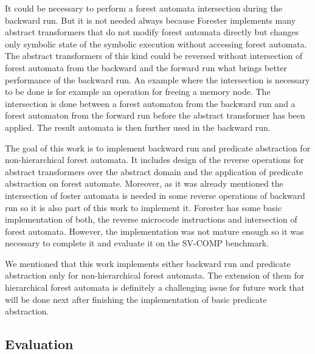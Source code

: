 \documentclass[fleqn,11pt]{ExcelAtFIT} %
\begin{document}
It could be necessary to perform a forest automata intersection during
the backward run.
But it is not needed always because Forester implements many abstract transformers
that do not modify forest automata directly but changes only symbolic state of the symbolic execution
without accessing forest automata.
The abstract transformers of this kind could be reversed without intersection of forest automata
from the backward and the forward run what brings better performance of the backward run.
An example where the intersection is necessary to be done is for example an operation for freeing a memory node.
The intersection is done between a forest automaton from the backward run and a forest automaton from the forward
run before the abstract transformer has been applied.
The result automata is then further used in the backward run.

The goal of this work is to implement backward run and predicate abstraction
for non-hierarchical forest automata.
It includes design of the reverse operations for abstract transformers over
the abstract domain and the application of predicate abstraction on forest automate.
Moreover, as it was already mentioned the intersection of foster automata is needed in some reverse
operations of backward run so it is also part of this work to implement it.
Forester has some basic implementation of both, the reverse microcode instructions and
intersection of forest automata.
However, the implementation was not mature enough so it was necessary to
complete it and evaluate it on the SV-COMP benchmark.

We mentioned that this work implements either backward run and predicate abstraction only for
non-hierarchical forest automata.
The extension of them for hierarchical forest automata is definitely a challenging issue for future work
that will be done next after finishing the implementation of basic predicate abstraction.

\subsection{Evaluation}
\end{document}
